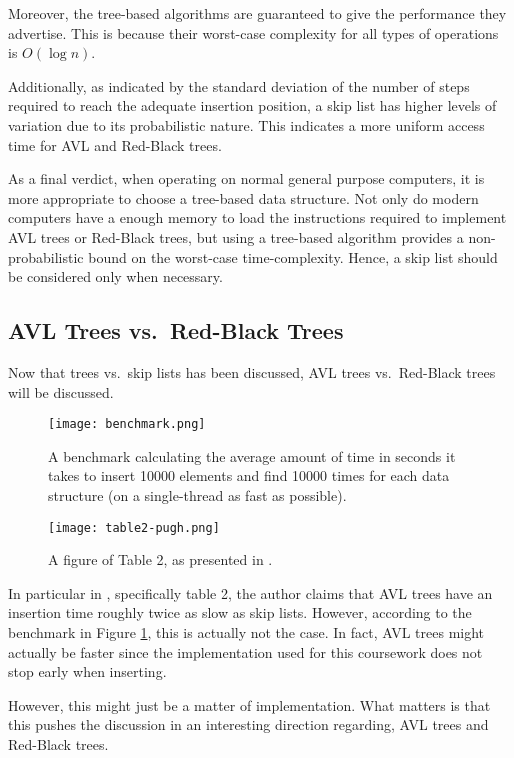 \documentclass[article]{uom-coursework}
\begin{document}
Moreover, the tree-based algorithms are guaranteed to give the
performance they advertise. This is because
their worst-case complexity for all types of operations
is $O(\log n)$.

Additionally, as indicated by the standard deviation of the
number of steps required to reach the adequate insertion
position, a skip list has higher levels of variation due to its
probabilistic nature. This indicates a more uniform access time
for AVL and Red-Black trees.

As a final verdict, when operating on normal general purpose
computers, it is more appropriate to choose a tree-based data
structure. Not only do modern computers have a enough memory to
load the instructions required to implement AVL trees or
Red-Black trees, but using a tree-based algorithm provides a
non-probabilistic bound on the worst-case time-complexity.
Hence, a skip list should be considered only when necessary.

\subsection{AVL Trees vs.\ Red-Black Trees}

Now that trees vs.\ skip lists has been discussed, AVL trees
vs.\ Red-Black trees will be discussed.

\begin{figure}[H]
\centering
\texttt{[image: benchmark.png]}
\caption{A benchmark calculating the average amount of time in
seconds it takes to insert 10000 elements and find 10000 times
for each data structure (on a single-thread as fast as
possible).}
\label{fig:benchmark}
\end{figure}

\begin{figure}[H]
\centering
\texttt{[image: table2-pugh.png]}
\caption{A figure of Table 2, as presented in \textcite{pugh90}.}
\label{fig:test9}
\end{figure}

In particular in \textcite{pugh90}, specifically table 2, the
author claims that AVL trees have an insertion time roughly
twice as slow as skip lists. However, according to the benchmark
in Figure \ref{fig:benchmark}, this is actually not the case. In
fact, AVL trees might actually be faster since the
implementation used for this coursework does not stop early when
inserting.

However, this might just be a matter of implementation. What
matters is that this pushes the discussion in an interesting
direction regarding, AVL trees and Red-Black trees.
\end{document}

